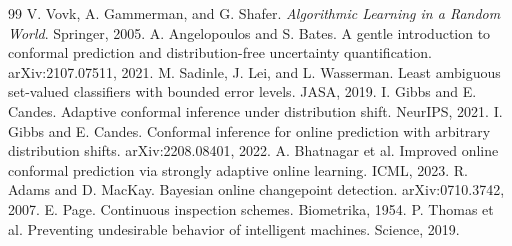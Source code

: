 \documentclass[10pt]{article}
\begin{document}
\begin{thebibliography}{99}
 V. Vovk, A. Gammerman, and G. Shafer. \emph{Algorithmic Learning in a Random World}. Springer, 2005.
 A. Angelopoulos and S. Bates. A gentle introduction to conformal prediction and distribution-free uncertainty quantification. arXiv:2107.07511, 2021.
 M. Sadinle, J. Lei, and L. Wasserman. Least ambiguous set-valued classifiers with bounded error levels. JASA, 2019.
 I. Gibbs and E. Candes. Adaptive conformal inference under distribution shift. NeurIPS, 2021.
 I. Gibbs and E. Candes. Conformal inference for online prediction with arbitrary distribution shifts. arXiv:2208.08401, 2022.
 A. Bhatnagar et al. Improved online conformal prediction via strongly adaptive online learning. ICML, 2023.
 R. Adams and D. MacKay. Bayesian online changepoint detection. arXiv:0710.3742, 2007.
 E. Page. Continuous inspection schemes. Biometrika, 1954.
 P. Thomas et al. Preventing undesirable behavior of intelligent machines. Science, 2019.
\end{thebibliography}
\end{document}
